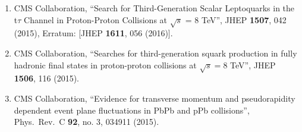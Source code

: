 \begin{itemize}
\begin{enumerate}
\item CMS Collaboration, ``Search for Third-Generation Scalar Leptoquarks in the t$\tau$ Channel in Proton-Proton Collisions at $\sqrt{s}$ = 8 TeV'', JHEP {\bf 1507}, 042 (2015), Erratum: [JHEP {\bf 1611}, 056 (2016)].

\item CMS Collaboration, ``Searches for third-generation squark production in fully hadronic final states in proton-proton collisions at $ \sqrt{s} = 8$ TeV'', JHEP {\bf 1506}, 116 (2015).

\item CMS Collaboration, ``Evidence for transverse momentum and pseudorapidity dependent event plane fluctuations in PbPb and pPb collisions'', Phys.\ Rev.\ C {\bf 92}, no. 3, 034911 (2015).
  \end{enumerate}
\end{itemize}
